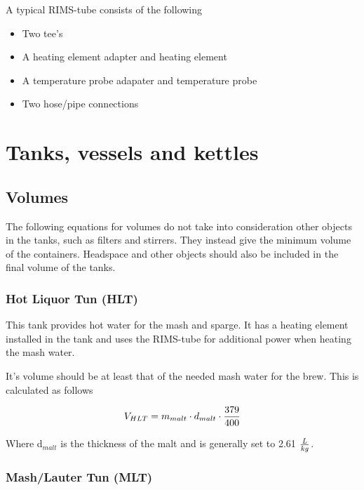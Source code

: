 \documentclass[11pt,fleqn,openany]{book} %
\begin{document}
A typical RIMS-tube consists of the following

\begin{itemize}
\item Two tee's
\item A heating element adapter and heating element
\item A temperature probe adapater and temperature probe
\item Two hose/pipe connections
\end{itemize}



\chapter{Tanks, vessels and kettles}

\section{Volumes}

The following equations for volumes do not take into consideration other objects in the tanks, such as filters and stirrers. They instead give the minimum volume of the containers. Headspace and other objects should also be included in the final volume of the tanks.

\subsection{Hot Liquor Tun (HLT)}

This tank provides hot water for the mash and sparge. It has a heating element installed in the tank and uses the RIMS-tube for additional power when heating the mash water.

It's volume should be at least that of the needed mash water for the brew. This is calculated as follows

\begin{equation}
V_{HLT} = m_{malt} \cdot d_{malt} \cdot {379 \over 400}
\end{equation}

Where d$_{malt}$ is the thickness of the malt and is generally set to 2.61 $L\over kg $.

\subsection{Mash/Lauter Tun (MLT)}
\end{document}
